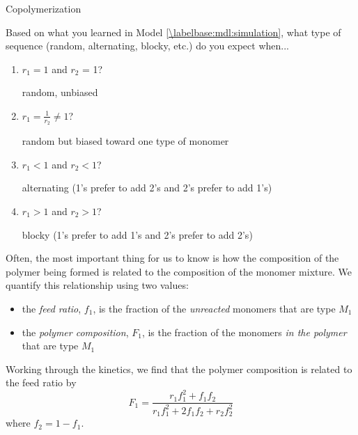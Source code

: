 \begin{activity}{Copolymerization}
\begin{ctqs}
	\question Based on what you learned in Model \ref{\labelbase:mdl:simulation}, what type of sequence (random, alternating, blocky, etc.) do you expect when...
	
		\begin{enumerate}
			\item $r_1 = 1$ and $r_2$ = 1?
			
				\begin{solution}[0.5in]{}
					random, unbiased
				\end{solution}
			
			\item $r_1 = \frac{1}{r_2} \neq 1$?
			
				\begin{solution}[0.5in]{}
					random but biased toward one type of monomer
				\end{solution}
			
			\item $r_1 < 1$ and $r_2 < 1$?
			
				\begin{solution}[0.5in]{}
					alternating (1's prefer to add 2's and 2's prefer to add 1's)
				\end{solution}
			
			\item $r_1 > 1$ and $r_2 > 1$?
			
				\begin{solution}[0.5in]{}
					blocky (1's prefer to add 1's and 2's prefer to add 2's)
				\end{solution}
		\end{enumerate}

\end{ctqs}

\begin{model}
	\label{\labelbase:mdl:feedratios}
	
	Often, the most important thing for us to know is how the composition of the polymer being formed is related to the composition of the monomer mixture.  We quantify this relationship using two values:
	\begin{itemize}
		\item the \emph{feed ratio}, $f_1$, is the fraction of the \emph{unreacted} monomers that are type $M_1$
		\item the \emph{polymer composition}, $F_1$, is the fraction of  the monomers \emph{in the polymer} that are type $M_1$
	\end{itemize}
	
	Working through the kinetics, we find that the polymer composition is related to the feed ratio by
	\begin{equation*}
		F_1 = \frac{r_1f_1^2 + f_1f_2}{r_1f_1^2+2f_1f_2 + r_2f_2^2}
	\end{equation*}
	where $f_2 = 1-f_1$.


\end{model}
\end{activity}

